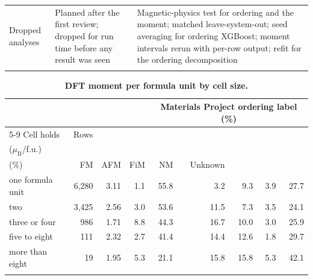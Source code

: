 \documentclass[pdflatex,sn-nature]{sn-jnl}
\makeatletter
\newcommand{\muB}{\ensuremath{\mu_\mathrm{B}}}
\newcommand{\hd}[1]{\begin{tabular}[b]{@{}c@{}}#1\end{tabular}}
\makeatother
\begin{document}
\begin{table}[!ht]
\begin{tabular}{@{}>{\raggedright\arraybackslash}p{88pt}>{\raggedright\arraybackslash}p{150pt}>{\raggedright\arraybackslash}p{116pt}@{}}
Dropped analyses & Planned after the first review; dropped for run time before any result was seen & Magnetic-physics test for ordering and the moment; matched leave-system-out; seed averaging for ordering XGBoost; moment intervals rerun with per-row output; refit for the ordering decomposition \\
\botrule
\end{tabular}
\end{table}

\begin{table}[!ht]
\caption{\textbf{DFT moment per formula unit by cell size.}}\label{tab:s15}%
\setlength{\tabcolsep}{3pt}%
\begin{tabular*}{\textwidth}{@{\extracolsep\fill}lrrrrrrrr@{}}
\toprule
& & & & \multicolumn{5}{c}{Materials Project ordering label (\%)} \\
\cmidrule{5-9}
Cell holds & Rows & \hd{Mean moment\\(\muB{}/f.u.)} & \hd{$|m|<0.05$\\(\%)} & FM & AFM & FiM & NM & Unknown \\
\midrule
one formula unit & 6,280 & 3.11 & 1.1 & 55.8 & 3.2 & 9.3 & 3.9 & 27.7 \\
two & 3,425 & 2.56 & 3.0 & 53.6 & 11.5 & 7.3 & 3.5 & 24.1 \\
three or four & 986 & 1.71 & 8.8 & 44.3 & 16.7 & 10.0 & 3.0 & 25.9 \\
five to eight & 111 & 2.32 & 2.7 & 41.4 & 14.4 & 12.6 & 1.8 & 29.7 \\
more than eight & 19 & 1.95 & 5.3 & 21.1 & 15.8 & 15.8 & 5.3 & 42.1 \\
\botrule
\end{tabular*}
\end{table}
\end{document}
